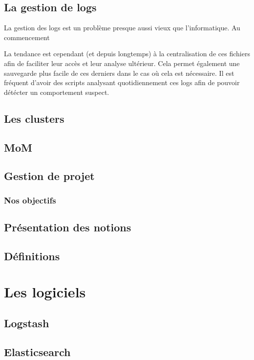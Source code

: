 \documentclass[a4paper,12pt,one side,titlepage]{report}
\begin{document}
\chapter{La gestion de logs}

La gestion des \gls{logs} est un problème presque aussi vieux que l'informatique.
Au commencement 

La tendance est cependant (et depuis longtemps) à la centralisation de ces fichiers afin de faciliter 
leur accès et leur analyse ultérieur. Cela permet également une sauvegarde plus facile de ces derniers 
dans le cas où cela est nécessaire. Il est fréquent d'avoir des scripts analysant 
quotidiennement ces \gls{logs} afin de pouvoir détécter un comportement suspect.


\lipsum
\chapter{Les clusters}

\lipsum

\chapter{MoM}

\lipsum

\chapter{Gestion de projet}
\lipsum
%
\section{Nos objectifs}
\lipsum
\chapter{Présentation des notions}
\chapter{Définitions}

\part{Les logiciels}
\chapter{Logstash}


\chapter{Elasticsearch}

\end{document}
